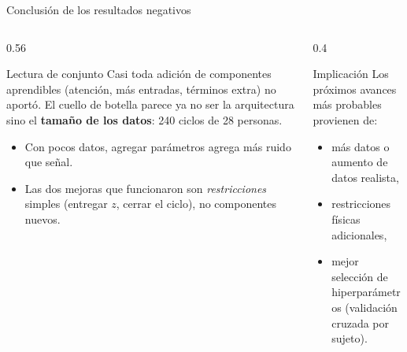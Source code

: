 \documentclass[aspectratio=169,10pt,t]{beamer}
\begin{document}
\begin{frame}{Conclusión de los resultados negativos}
\begin{columns}[T]
\begin{column}{0.56\textwidth}
\begin{block}{Lectura de conjunto}
Casi toda adición de componentes aprendibles (atención, más entradas, términos extra) \alert{no aportó}. El cuello de botella parece ya no ser la arquitectura sino el \textbf{tamaño de los datos}: 240 ciclos de 28 personas.
\end{block}
\begin{itemize}\setlength{\itemsep}{3pt}\small
\item Con pocos datos, agregar parámetros agrega más ruido que señal.
\item Las dos mejoras que funcionaron son \emph{restricciones} simples (entregar $z$, cerrar el ciclo), no componentes nuevos.
\end{itemize}
\end{column}
\begin{column}{0.4\textwidth}
\begin{exampleblock}{Implicación}
Los próximos avances más probables provienen de:
\begin{itemize}\setlength{\itemsep}{1pt}\small
\item más datos o aumento de datos realista,
\item restricciones físicas adicionales,
\item mejor selección de hiperparámetros (validación cruzada por sujeto).
\end{itemize}
\end{exampleblock}
\end{column}
\end{columns}
\end{frame}
\end{document}
